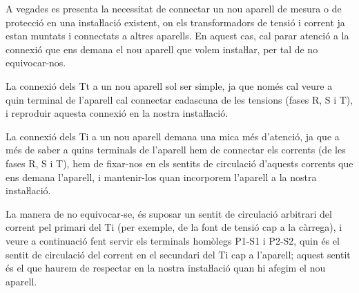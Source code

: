 A vegades es presenta la necessitat de connectar un nou aparell de
mesura o de protecció en una instaŀlació existent, on els
transformadors de tensió i corrent ja estan muntats i connectats a
altres aparells. En aquest cas, cal parar atenció a la connexió
que ens demana el nou aparell que volem instaŀlar, per tal de no
equivocar-nos.

La connexió dels Tt a un nou aparell sol ser simple, ja que només
cal veure a quin terminal de l'aparell cal connectar cadascuna de
les tensions (fases R, S i T), i reproduir aquesta connexió en la
nostra instaŀlació.

La connexió dels Ti a un nou aparell demana una mica més
d'atenció, ja que a més de saber a  quins terminals de l'aparell hem
de connectar els corrents (de les fases R, S i T), hem de fixar-nos
en els sentits de circulació d'aquests corrents que ens demana
l'aparell, i mantenir-los quan incorporem l'aparell a la nostra
instaŀlació.

 La manera de no equivocar-se, és suposar un sentit de
circulació arbitrari del corrent  pel primari del Ti (per exemple,
de la font de tensió cap a la càrrega), i veure a continuació fent
servir els terminals homòlegs P1-S1 i P2-S2, quin és el sentit de
circulació del corrent en el secundari del Ti cap a l'aparell;
aquest sentit és el que haurem de respectar en la nostra
instaŀlació quan hi afegim el nou aparell.

